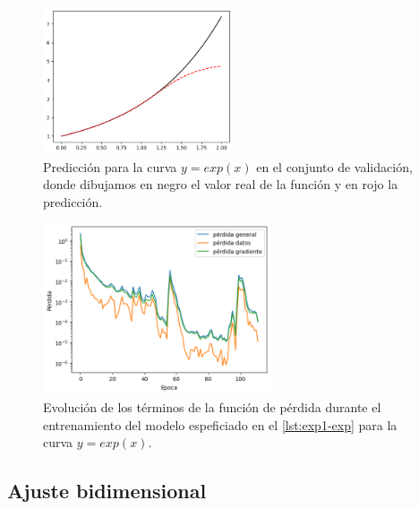 \begin{figure}[htbp]
    \centering
    \includegraphics[width=0.5\textwidth]{img/img86.png}
    \caption{Predicción para la curva $y=exp(x)$ en el conjunto de validación, donde dibujamos en negro el valor real de la función y en rojo la predicción.}
    \label{fig:img86}
\end{figure}

\begin{figure}[htbp]
    \centering
    \includegraphics[width=0.6\textwidth]{img/img87.png}
    \caption{Evolución de los términos de la función de pérdida durante el entrenamiento del modelo espeficiado en el \autoref{lst:exp1-exp} para la curva $y=exp(x)$.}
    \label{fig:img87}
\end{figure}


\subsection{Ajuste bidimensional}

